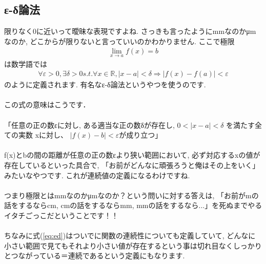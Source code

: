 \documentclass[11pt,a4paper]{jreport}
\begin{document}
\subsection{ε-δ論法 \label{ed}}
限りなく0に近いって曖昧な表現ですよね. さっきも言ったようにmmなのかμmなのか, どこからが限りないと言っていいのかわかりません. ここで極限
\begin{eqnarray}
\lim_{x\to a} f(x) = b
\end{eqnarray}
は数学語では
\begin{eqnarray}
\forall \varepsilon >0, \exists \delta>0  s.t.  \forall x \in \mathbb{R}, |x-a|<\delta \Rightarrow |f(x)-f(a)|<\varepsilon
\label{eq:ed}
\end{eqnarray}
のように定義されます. 有名なε-δ論法というやつを使うのです.\\
\\
この式の意味はこうです．\\
\\
「任意の正の数εに対し, ある適当な正の数δが存在し, $ 0 < |x − a| < δ$ を満たす全ての実数 xに対し、 $|f(x) − b| < ε$が成り立つ」\\
\\
f(x)とbの間の距離が任意の正の数εより狭い範囲において, 必ず対応するxの値が存在しているといった具合で, 「お前がどんなに頑張ろうと俺はその上をいく」みたいなやつです. これが連続値の定義になるわけですね.
\\
\\
つまり極限とはmmなのかμmなのか？という問いに対する答えは, 「お前がmの話をするならcm, cmの話をするならmm, mmの話をするなら...」を死ぬまでやるイタチごっこだということです！！\\
\\
ちなみに式(\ref{eq:ed})はついでに関数の連続性についても定義していて, どんなに小さい範囲で見てもそれより小さい値が存在するという事は切れ目なくしっかりとつながっている＝連続であるという定義にもなります.\\
\end{document}
